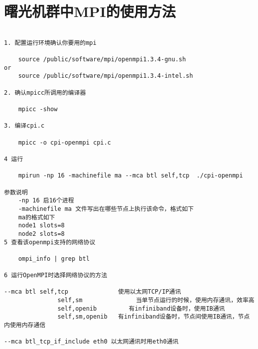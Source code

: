 

\section{曙光机群中MPI的使用方法}
\begin{verbatim}

1. 配置运行环境确认你要用的mpi

	source /public/software/mpi/openmpi1.3.4-gnu.sh
or 
	source /public/software/mpi/openmpi1.3.4-intel.sh

2. 确认mpicc所调用的编译器

	mpicc -show

3. 编译cpi.c
	
	mpicc -o cpi-openmpi cpi.c

4 运行

	mpirun -np 16 -machinefile ma --mca btl self,tcp  ./cpi-openmpi

参数说明
	-np 16 启16个进程
	-machinefile ma 文件写出在哪些节点上执行该命令，格式如下
	ma的格式如下
	node1 slots=8
	node2 slots=8
5 查看该openmpi支持的网络协议

	ompi_info | grep btl 

6 运行OpenMPI时选择网络协议的方法

--mca btl self,tcp              使用以太网TCP/IP通讯
               self,sm               当单节点运行的时候，使用内存通讯，效率高
               self,openib         有infiniband设备时，使用IB通讯
               self,sm,openib   有infiniband设备时，节点间使用IB通讯，节点内使用内存通信

--mca btl_tcp_if_include eth0 以太网通讯时用eth0通讯
\end{verbatim}

\newpage

